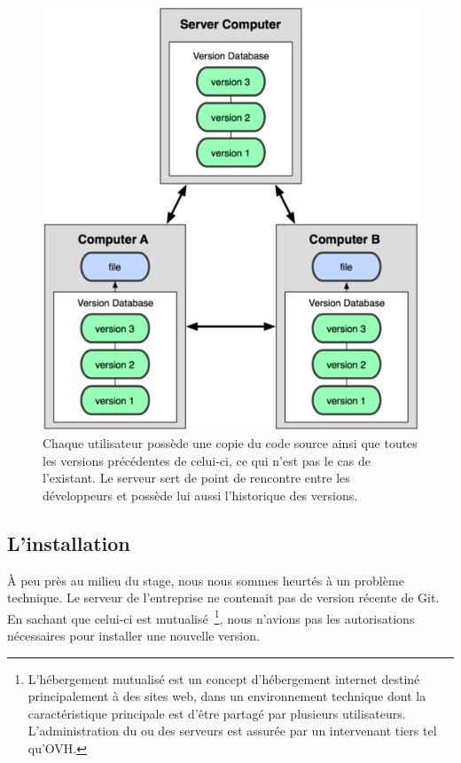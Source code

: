 \begin{figure}
  \begin{center}
    \includegraphics[scale=1.3]{images/workflow.png}
    \caption{ Chaque utilisateur possède une copie du code source
    ainsi que toutes les versions précédentes de celui-ci, ce qui n'est pas
    le cas de l'existant. Le serveur sert de point de rencontre entre les
    développeurs et possède lui aussi l’historique des versions.}
    \label{workflow}
  \end{center}
\end{figure}

\subsection{L'installation} %
\label{sub:L'installation}

À peu près au milieu du stage, nous nous sommes heurtés à un problème
technique. Le serveur de l'entreprise ne contenait pas de version
récente de Git. En sachant que celui-ci est mutualisé\,
\footnote{L'hébergement mutualisé est un concept d'hébergement internet
destiné principalement à des sites web, dans un environnement technique
dont la caractéristique principale est d'être partagé par plusieurs
utilisateurs. L'administration du ou des serveurs est assurée par un
intervenant tiers tel qu'OVH.}, nous n'avions pas les autorisations
nécessaires pour installer une nouvelle version.

